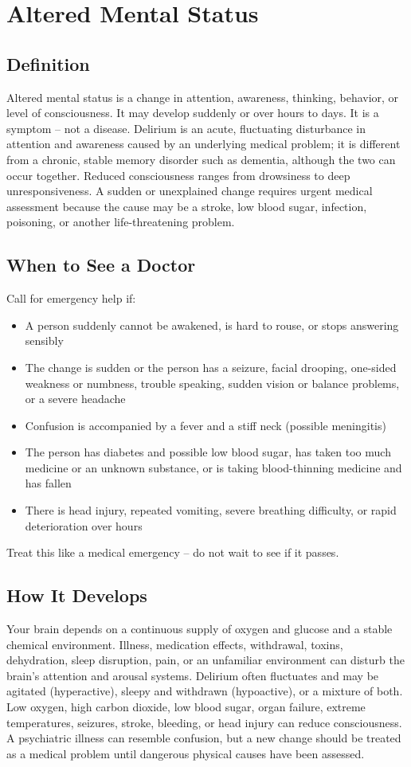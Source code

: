 \chapter{Altered Mental Status}

\section*{Definition}
Altered mental status is a change in attention, awareness, thinking, behavior, or level of consciousness. It may develop suddenly or over hours to days. It is a symptom -- not a disease. Delirium is an acute, fluctuating disturbance in attention and awareness caused by an underlying medical problem; it is different from a chronic, stable memory disorder such as dementia, although the two can occur together. Reduced consciousness ranges from drowsiness to deep unresponsiveness. A sudden or unexplained change requires urgent medical assessment because the cause may be a stroke, low blood sugar, infection, poisoning, or another life-threatening problem.

\section*{When to See a Doctor}
Call for emergency help if:
\begin{itemize}
  \item A person suddenly cannot be awakened, is hard to rouse, or stops answering sensibly
  \item The change is sudden or the person has a seizure, facial drooping, one-sided weakness or numbness, trouble speaking, sudden vision or balance problems, or a severe headache
  \item Confusion is accompanied by a fever and a stiff neck (possible meningitis)
  \item The person has diabetes and possible low blood sugar, has taken too much medicine or an unknown substance, or is taking blood-thinning medicine and has fallen
  \item There is head injury, repeated vomiting, severe breathing difficulty, or rapid deterioration over hours
\end{itemize}
Treat this like a medical emergency -- do not wait to see if it passes.

\section*{How It Develops}
Your brain depends on a continuous supply of oxygen and glucose and a stable chemical environment. Illness, medication effects, withdrawal, toxins, dehydration, sleep disruption, pain, or an unfamiliar environment can disturb the brain's attention and arousal systems. Delirium often fluctuates and may be agitated (hyperactive), sleepy and withdrawn (hypoactive), or a mixture of both. Low oxygen, high carbon dioxide, low blood sugar, organ failure, extreme temperatures, seizures, stroke, bleeding, or head injury can reduce consciousness. A psychiatric illness can resemble confusion, but a new change should be treated as a medical problem until dangerous physical causes have been assessed.


